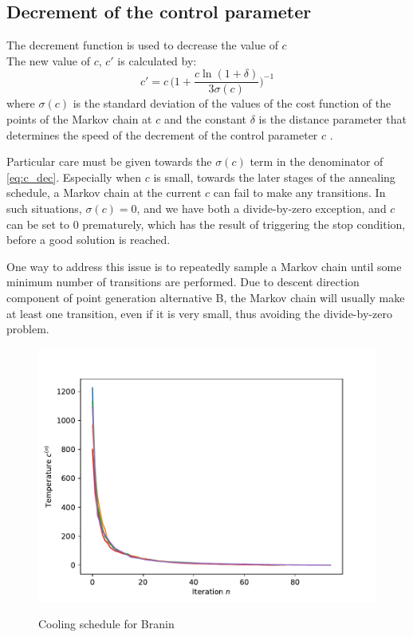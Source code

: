 

\subsection{Decrement of the control parameter}
The decrement function is used to decrease the value of $c$\\
The new value of $c$, $c'$ is calculated by:
\begin{equation}\label{eq:c_dec}
    c'=c \, \Bigg(1+\dfrac{c\ln(1+\delta)}{3\sigma (c)}\Bigg)^{-1} 
\end{equation} 
where $\sigma(c)$ is the standard deviation of the values of the cost function of the points of the Markov chain at $c$ and the constant $\delta$ is the distance parameter that determines the speed of the decrement of the control parameter $c$ \cite{dekkers}.

Particular care must be given towards the $\sigma(c)$ term in the denominator of \cref{eq:c_dec}. Especially when $c$ is small, towards
the later stages of the annealing schedule, a Markov chain at the current $c$ can fail to make any transitions. In such situations,
$\sigma(c) = 0$, and we have both a divide-by-zero exception, and $c$ can be set to 0 prematurely, which has the result of triggering
the stop condition, before a good solution is reached.

One way to address this issue is to repeatedly sample a Markov chain until some minimum number of transitions are performed. Due to
descent direction component of point generation alternative B, the Markov chain will usually make at least one transition, even
if it is very small, thus avoiding the divide-by-zero problem.

\begin{figure}[h]
    \centering
    \caption{Cooling schedule for Branin}
    \includegraphics[scale=0.42]{figures/fig31-branin.pdf}
    \label{fig:512}
\end{figure}

